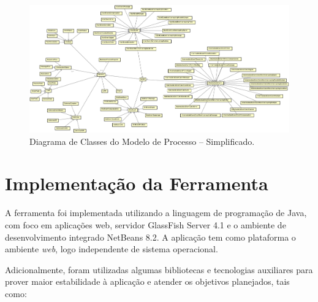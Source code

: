 \begin{landscape}

\begin{figure}[!htb]
\centering
\includegraphics[width=1.55\textwidth]{images/classesbpmn.png}
\caption{Diagrama de Classes do Modelo de Processo -- Simplificado.}
\label{img:classesmodelo}
\end{figure}

\end{landscape}

\section{Implementação da Ferramenta}

A ferramenta foi implementada utilizando a linguagem de programação de Java, com foco em aplicações web, servidor GlassFish Server 4.1 e o ambiente de desenvolvimento integrado NetBeans 8.2. A aplicação tem como plataforma o ambiente \textit{web}, logo independente de sistema operacional.

Adicionalmente, foram utilizadas algumas bibliotecas e tecnologias auxiliares para prover maior estabilidade à aplicação e atender os objetivos planejados, tais como:

